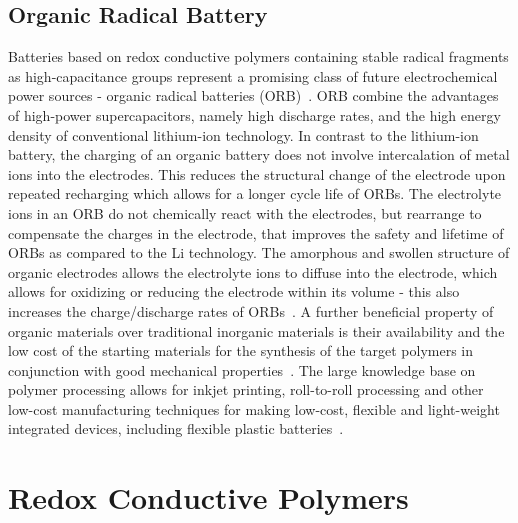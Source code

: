 \subsection{Organic Radical Battery}

Batteries based on redox conductive polymers containing stable radical fragments as high-capacitance groups represent a promising class of future electrochemical power sources - organic radical batteries (ORB)~\cite{nakahara2002_cpl, nishide2004_electact,xie2021_mathoriz,Rohland_2021}. ORB combine the advantages of high-power supercapacitors, namely high discharge rates, and the high energy density of conventional lithium-ion technology. In contrast to the lithium-ion battery, the charging of an organic battery does not involve intercalation of metal ions into the electrodes. This reduces the structural change of the electrode upon repeated recharging which allows for a longer cycle life of ORBs. The electrolyte ions in an ORB do not chemically react with the electrodes, but rearrange to compensate the charges in the electrode, that improves the safety and lifetime of ORBs as compared to the Li technology. The amorphous and swollen structure of organic electrodes allows the electrolyte ions to diffuse into the electrode, which allows for oxidizing or reducing the electrode within its volume - this also increases the charge/discharge rates of ORBs~\cite{nishide_2009}. A further beneficial property of organic materials over traditional inorganic materials is their availability and the low cost of the starting materials for the synthesis of the target polymers in conjunction with good mechanical properties~\cite{janoschka2012_advmater, muench2016_chemrev, friebe2017_topcurrchem}. The large knowledge base on polymer processing allows for inkjet printing, roll-to-roll processing and other low-cost manufacturing techniques for making low-cost, flexible and light-weight integrated devices, including flexible plastic batteries~\cite{janoschka2012_advmater,nishide_2009}. 



\section{Redox Conductive Polymers}

